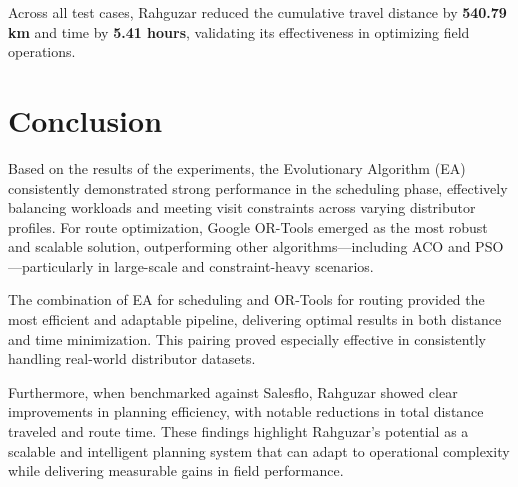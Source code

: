 Across all test cases, Rahguzar reduced the cumulative travel distance by \textbf{540.79 km} and time by \textbf{5.41 hours}, validating its effectiveness in optimizing field operations.


\section{Conclusion}
Based on the results of the experiments, the Evolutionary Algorithm (EA) consistently demonstrated strong performance in the scheduling phase, effectively balancing workloads and meeting visit constraints across varying distributor profiles. For route optimization, Google OR-Tools emerged as the most robust and scalable solution, outperforming other algorithms—including ACO and PSO—particularly in large-scale and constraint-heavy scenarios.

The combination of EA for scheduling and OR-Tools for routing provided the most efficient and adaptable pipeline, delivering optimal results in both distance and time minimization. This pairing proved especially effective in consistently handling real-world distributor datasets.

Furthermore, when benchmarked against Salesflo, Rahguzar showed clear improvements in planning efficiency, with notable reductions in total distance traveled and route time. These findings highlight Rahguzar’s potential as a scalable and intelligent planning system that can adapt to operational complexity while delivering measurable gains in field performance.